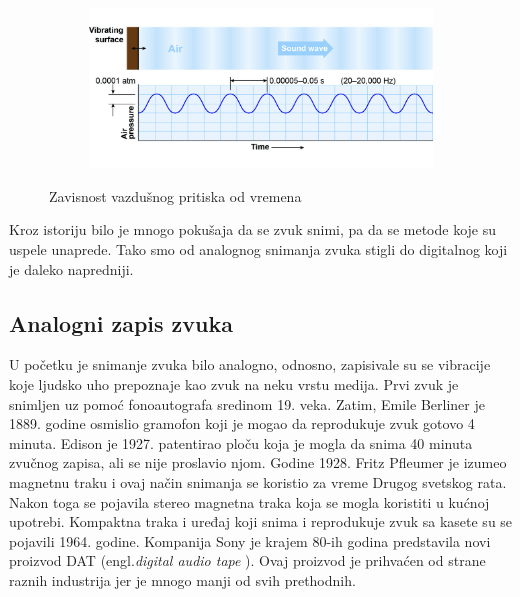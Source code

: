 \documentclass[a4paper]{article}
\begin{document}
  \begin{figure}[h]
        \centering
        
        \begin{subfigure}[t]{0.49\textwidth}
            \centering
            \includegraphics[width=1\textwidth]{airpressure}
        \end{subfigure}
        \caption{Zavisnost vazdušnog pritiska od vremena}
        \label{fig:slika1}
    \end{figure}
  
    Kroz istoriju bilo je mnogo pokušaja da se zvuk snimi, pa da se metode koje su uspele unaprede. Tako smo od analognog snimanja zvuka stigli do digitalnog koji je daleko napredniji. 
    
    \subsection {Analogni zapis zvuka}
    U početku je snimanje zvuka bilo analogno, odnosno, zapisivale su se vibracije koje ljudsko uho prepoznaje kao zvuk na neku vrstu medija. 
    Prvi zvuk je snimljen uz pomoć fonoautografa sredinom 19. veka. Zatim, Emile Berliner je 1889. godine osmislio gramofon koji je mogao da reprodukuje zvuk gotovo 4 minuta. Edison je 1927. patentirao ploču
    koja je mogla da snima 40 minuta zvučnog zapisa, ali se nije proslavio njom. Godine 1928. Fritz Pfleumer je izumeo magnetnu traku i ovaj način snimanja se koristio za vreme Drugog svetskog rata. Nakon toga se pojavila
    stereo magnetna traka koja se mogla koristiti u kućnoj upotrebi. Kompaktna traka i uređaj koji snima i reprodukuje zvuk sa kasete su se pojavili 1964. godine. Kompanija Sony je krajem 80-ih godina predstavila
    novi proizvod DAT (engl.\textit {digital audio tape} ). Ovaj proizvod je prihvaćen od strane raznih industrija jer je mnogo manji od svih prethodnih.
\end{document}
